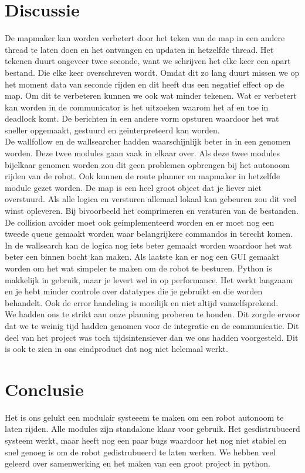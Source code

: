 \documentclass[a4paper,10pt]{article}
\begin{document}
\section{Discussie}
De mapmaker kan worden verbetert door het teken van de map in een andere thread te laten doen en het ontvangen en updaten in hetzelfde thread. Het tekenen duurt ongeveer twee seconde, want we schrijven het elke keer een apart bestand. Die elke keer overschreven wordt. Omdat dit zo lang duurt missen we op het moment data van seconde rijden en dit heeft dus een negatief effect op de map. Om dit te verbeteren
kunnen we ook wat minder tekenen. Wat er verbetert kan worden in de communicator is het uitzoeken waarom het af en toe in deadlock komt. De berichten in een andere vorm opsturen waardoor het wat sneller opgemaakt, gestuurd en geinterpreteerd kan worden.\\
De wallfollow en de wallsearcher hadden waarschijnlijk beter in in een genomen worden. Deze twee modules gaan vaak in elkaar over. Als deze twee modules bijelkaar genomen worden zou dit geen problemen opbrengen bij het autonoom rijden van de robot. Ook kunnen de route planner en mapmaker in hetzelfde module gezet worden. De map is een heel groot object dat je liever niet overstuurd. Als alle logica en versturen allemaal lokaal kan gebeuren zou dit veel winst opleveren. Bij bivoorbeeld het comprimeren en versturen van de bestanden.\\
De collision avoider moet ook geimplementeerd worden en er moet nog een tweede queue gemaakt worden waar belangrijkere commandos in terecht komen. In de wallsearch kan de logica nog iets beter gemaakt worden waardoor het wat beter een binnen bocht kan maken. Als laatste kan er nog een GUI gemaakt worden om het wat simpeler te maken om de robot te besturen. 
Python is makkelijk in gebruik, maar je levert wel in op performance. Het werkt langzaam en je hebt minder controle over datatypes die je gebruikt en die worden behandelt. Ook de error handeling is moeilijk en niet altijd vanzelfsprekend.\\
We hadden ons te strikt aan onze planning proberen te houden. Dit zorgde ervoor dat we te weinig tijd hadden genomen voor de integratie en de communicatie. Dit deel van het project was toch tijdsintensiever dan we ons hadden voorgesteld. Dit is ook te zien in ons eindproduct dat nog niet helemaal werkt. 
\section{Conclusie}
Het is ons gelukt een modulair systeeem te maken om een robot autonoom te laten rijden. Alle modules zijn standalone klaar voor gebruik. Het gesdistrubueerd systeem werkt, maar heeft nog een paar bugs waardoor het nog niet stabiel en snel genoeg is om de robot gedistrubueerd te laten werken. We hebben veel geleerd over samenwerking en het maken van een groot project in python.
\end{document}
